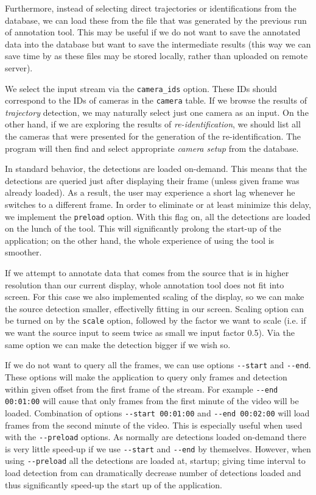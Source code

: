 Furthermore, instead of selecting direct trajectories or identifications from the
database, we can load these from the file that was generated by the previous run of
annotation tool. This may be useful if we do not want to save the annotated data
into the database but want to save the intermediate results (this way we can save
time by as these files may be stored locally, rather than uploaded on remote
server).

We select the input stream via the \texttt{\-\-camera\_ids} option. These IDs should
correspond to the IDs of cameras in the \texttt{camera} table. If we browse the
results of \emph{trajectory} detection, we may naturally select just one camera
as an input. On the other hand, if we are exploring the results of
\emph{re-identification}, we should list all the cameras that were presented
for the generation of the re-identification. The program will then find and select
appropriate \emph{camera setup} from the database.

In standard behavior, the detections are loaded on-demand. This means that the detections
are queried just after displaying their frame (unless given frame was already loaded).
As a result, the user may experience a short lag whenever he switches to a different frame.
In order to eliminate or at least minimize this delay, we implement the
\texttt{\-\-preload} option. With this flag on, all the detections are loaded on the
lunch of the tool. This will significantly prolong the start-up of the application; on the other hand, the whole experience of using the tool is smoother.

If we attempt to annotate data that comes from the source that is in higher resolution
than our current display, whole annotation tool does not fit into screen. For this case
we also implemented scaling of the display, so we can make the source detection smaller,
effectivelly fitting in our screen. Scaling option can be turned on by the
\texttt{\-\-scale} option, followed by the factor we want to scale (i.e. if we want the
source input to seem twice as small we input factor 0.5). Via the same option we can
make the detection bigger if we wish so.

If we do not want to query all the frames, we can use options \verb+--start+ and
\verb+--end+. These options will make the application to query only frames and detection
within given offset from the first frame of the stream. For example \verb+--end 00:01:00+
will cause that only frames from the first minute of the video will be loaded.
Combination of options \verb+--start 00:01:00+ and \verb+--end 00:02:00+ will load
frames from the second minute of the video. This is especially useful when used with
the \verb+--preload+ options. As normally are detections loaded on-demand there is very
little speed-up if we use \verb+--start+ and \verb+--end+ by themselves. However, when
using \verb+--preload+ all the detections are loaded at, startup; giving time interval
to load detection from can dramatically decrease number of detections loaded and thus
significantly speed-up the start up of the application.

